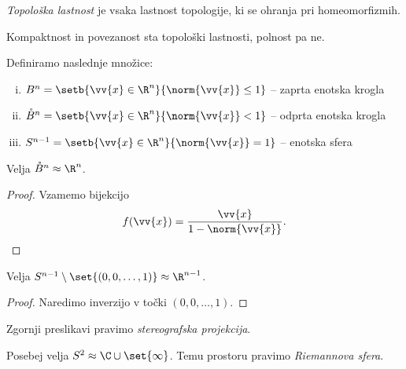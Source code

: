 \obvs

\begin{definicija}
\emph{Topološka lastnost} je
vsaka lastnost topologije, ki se ohranja pri homeomorfizmih.
\end{definicija}

\begin{opomba}
Kompaktnost in povezanost sta topološki lastnosti, polnost pa ne.
\end{opomba}

\begin{definicija}
Definiramo naslednje množice:

\begin{enumerate}[i)]
\item $B^n = \setb{\vv{x} \in \R^n}{\norm{\vv{x}} \leq 1}$
-- zaprta enotska krogla
\item $\mathring{B}^n = \setb{\vv{x} \in \R^n}{\norm{\vv{x}} < 1}$
-- odprta enotska krogla
\item $S^{n-1} = \setb{\vv{x} \in \R^n}{\norm{\vv{x}} = 1}$
-- enotska sfera
\end{enumerate}
\end{definicija}

\begin{trditev}
Velja $\mathring{B}^n \approx \R^n$.
\end{trditev}

\begin{proof}
Vzamemo bijekcijo
\[
f(\vv{x}) = \frac{\vv{x}}{1 - \norm{\vv{x}}}. \qedhere
\]
\end{proof}

\begin{trditev}
Velja $S^{n-1} \setminus \set{(0,0,\dots,1)} \approx \R^{n-1}$.
\end{trditev}

\begin{proof}
Naredimo inverzijo v točki $(0,0,\dots,1)$.
\end{proof}

\begin{opomba}
Zgornji preslikavi pravimo
\emph{stereografska projekcija}.
\end{opomba}

\begin{opomba}
Posebej velja $S^2 \approx \C \cup \set{\infty}$. Temu prostoru
pravimo
\emph{Riemannova sfera}.
\end{opomba}

